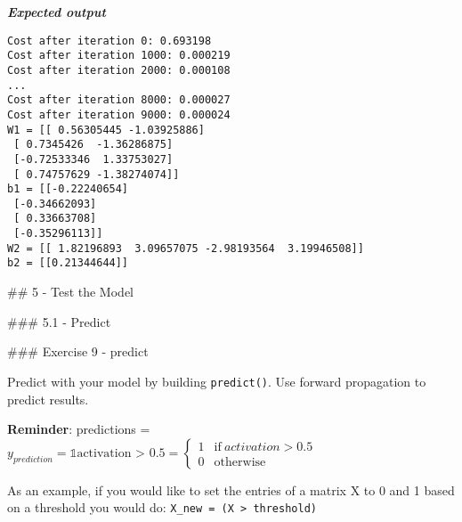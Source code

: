 \documentclass[11pt]{article}
\begin{document}
    \textbf{\emph{Expected output}}

\begin{verbatim}
Cost after iteration 0: 0.693198
Cost after iteration 1000: 0.000219
Cost after iteration 2000: 0.000108
...
Cost after iteration 8000: 0.000027
Cost after iteration 9000: 0.000024
W1 = [[ 0.56305445 -1.03925886]
 [ 0.7345426  -1.36286875]
 [-0.72533346  1.33753027]
 [ 0.74757629 -1.38274074]]
b1 = [[-0.22240654]
 [-0.34662093]
 [ 0.33663708]
 [-0.35296113]]
W2 = [[ 1.82196893  3.09657075 -2.98193564  3.19946508]]
b2 = [[0.21344644]]
\end{verbatim}

    \#\# 5 - Test the Model

\#\#\# 5.1 - Predict

\#\#\# Exercise 9 - predict

Predict with your model by building \texttt{predict()}. Use forward
propagation to predict results.

\textbf{Reminder}: predictions =
\(y_{prediction} = \mathbb 1 \text{{activation > 0.5}} = \begin{cases}  1 & \text{if}\ activation > 0.5 \\  0 & \text{otherwise}  \end{cases}\)

As an example, if you would like to set the entries of a matrix X to 0
and 1 based on a threshold you would do:
\texttt{X\_new\ =\ (X\ \textgreater{}\ threshold)}
\end{document}
